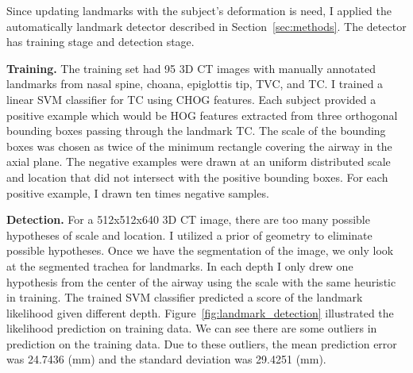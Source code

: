 Since updating landmarks with the subject's deformation is need, I applied the automatically landmark detector described in Section~\ref{sec:methods}.
The detector has training stage and detection stage.

{\bf Training.} 
The training set had 95 3D CT images with manually annotated landmarks from nasal spine, choana, epiglottis tip, TVC, and TC.
I trained a linear SVM classifier for TC using CHOG features.
Each subject provided a positive example which would be HOG features extracted from three orthogonal bounding boxes passing through the landmark TC.
The scale of the bounding boxes was chosen as twice of the minimum rectangle covering the airway in the axial plane.
The negative examples were drawn at an uniform distributed scale and location that did not intersect with the positive bounding boxes.
For each positive example, I drawn ten times negative samples.

{\bf Detection.}
For a 512x512x640 3D CT image, there are too many possible hypotheses of scale and location.
I utilized a prior of geometry to eliminate possible hypotheses.
Once we have the segmentation of the image, we only look at the segmented trachea for landmarks.
In each depth I only drew one hypothesis from the center of the airway using the scale with the same heuristic in training.
The trained SVM classifier predicted a score of the landmark likelihood given different depth.
Figure~\ref{fig:landmark_detection} illustrated the likelihood prediction on training data.
We can see there are some outliers in prediction on the training data.
Due to these outliers, the mean prediction error was 24.7436 (mm) and the standard deviation was 29.4251 (mm).

